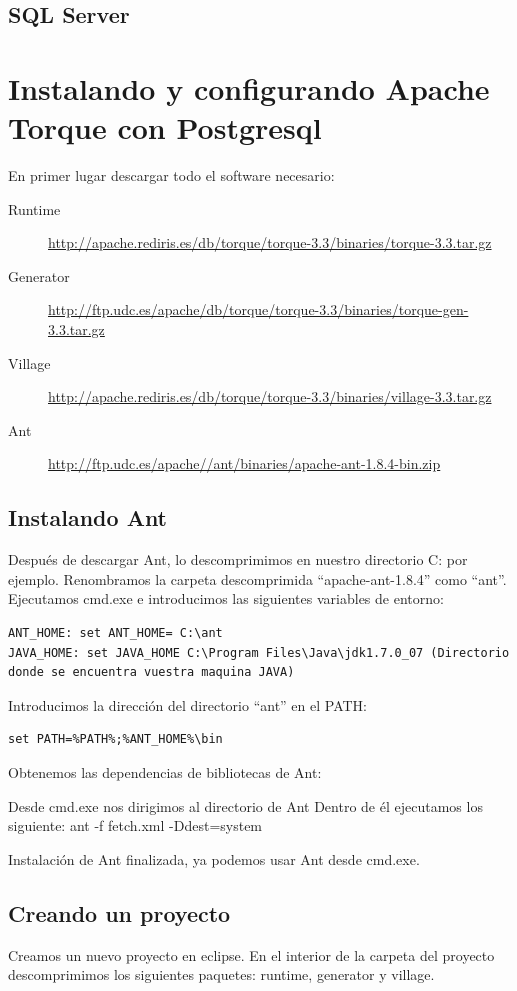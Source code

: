 \documentclass[12pt, oneside]{article}
\begin{document}
\subsection{SQL Server}

\section{Instalando y configurando Apache Torque con Postgresql}
En primer lugar descargar todo el software necesario:

\begin{description}
	\item[Runtime] \url{http://apache.rediris.es/db/torque/torque-3.3/binaries/torque-3.3.tar.gz}
	\item[Generator] \url{http://ftp.udc.es/apache/db/torque/torque-3.3/binaries/torque-gen-3.3.tar.gz}
	\item[Village] \url{http://apache.rediris.es/db/torque/torque-3.3/binaries/village-3.3.tar.gz}
	\item[Ant] \url{http://ftp.udc.es/apache//ant/binaries/apache-ant-1.8.4-bin.zip}
\end{description}

\subsection{Instalando Ant}
Después de descargar Ant, lo descomprimimos en nuestro directorio C: por ejemplo.
Renombramos la carpeta descomprimida “apache-ant-1.8.4” como “ant”.
Ejecutamos cmd.exe e introducimos las siguientes variables de entorno:

\begin{lstlisting}
ANT_HOME: set ANT_HOME= C:\ant
JAVA_HOME: set JAVA_HOME C:\Program Files\Java\jdk1.7.0_07 (Directorio donde se encuentra vuestra maquina JAVA)
\end{lstlisting}

Introducimos la dirección del directorio “ant” en el PATH:
\begin{lstlisting}
set PATH=%PATH%;%ANT_HOME%\bin
\end{lstlisting}

Obtenemos las dependencias de bibliotecas de Ant:

Desde cmd.exe nos dirigimos al directorio de Ant
Dentro de él ejecutamos los siguiente:  ant -f fetch.xml -Ddest=system

Instalación de Ant finalizada, ya podemos usar Ant desde cmd.exe.

\subsection{Creando un proyecto}
Creamos un nuevo proyecto en eclipse.
En el interior de la carpeta del proyecto descomprimimos los siguientes paquetes: runtime, generator y village.
\end{document}
